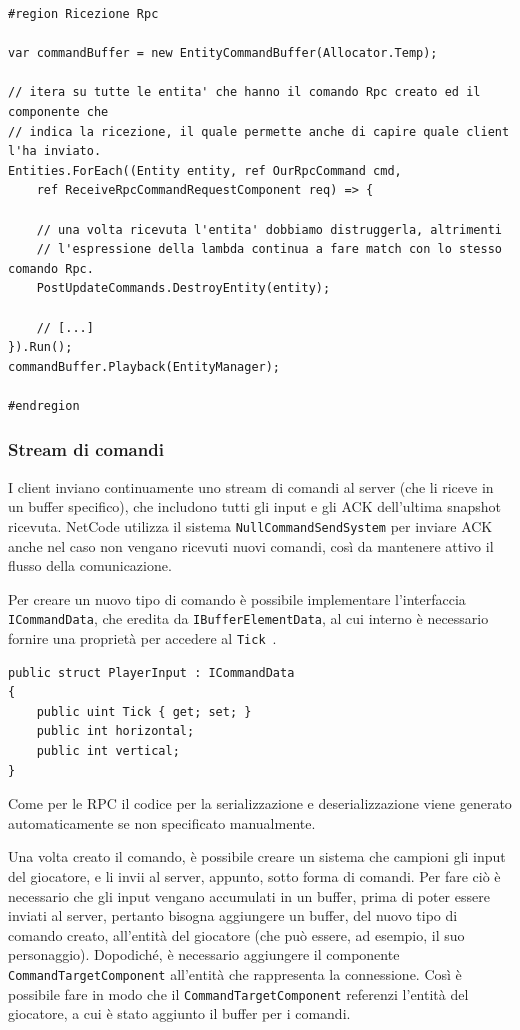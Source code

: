 \begin{lstlisting}[caption={Esempio di ricezione di un comando Rpc sul server.}, label={lst:example-rpc-server-system},language={[Sharp]C}]
#region Ricezione Rpc

var commandBuffer = new EntityCommandBuffer(Allocator.Temp);

// itera su tutte le entita' che hanno il comando Rpc creato ed il componente che
// indica la ricezione, il quale permette anche di capire quale client l'ha inviato.
Entities.ForEach((Entity entity, ref OurRpcCommand cmd,
    ref ReceiveRpcCommandRequestComponent req) => {
    
    // una volta ricevuta l'entita' dobbiamo distruggerla, altrimenti
    // l'espressione della lambda continua a fare match con lo stesso comando Rpc. 
    PostUpdateCommands.DestroyEntity(entity);
    
    // [...]
}).Run();
commandBuffer.Playback(EntityManager);

#endregion
\end{lstlisting}

\subsubsection{Stream di comandi}
I client inviano continuamente uno stream di comandi al server (che li riceve in un buffer specifico), che includono tutti gli input e gli ACK dell'ultima snapshot ricevuta. NetCode utilizza il sistema \verb|NullCommandSendSystem| per inviare ACK anche nel caso non vengano ricevuti nuovi comandi, così da mantenere attivo il flusso della comunicazione.

Per creare un nuovo tipo di comando è possibile implementare l'interfaccia \verb|ICommandData|, che eredita da \verb|IBufferElementData|, al cui interno è necessario fornire una proprietà per accedere al \verb|Tick|~\cite{doc:unity-netcode-api}.

\begin{lstlisting}[caption={Prototipo(client): comando per l'input del giocatore.}, label={lst:example-command-data},language={[Sharp]C}]
public struct PlayerInput : ICommandData
{
    public uint Tick { get; set; }
    public int horizontal;
    public int vertical;
}
\end{lstlisting}

Come per le RPC il codice per la serializzazione e deserializzazione viene generato automaticamente se non specificato manualmente.

Una volta creato il comando, è possibile creare un sistema che campioni gli input del giocatore, e li invii al server, appunto, sotto forma di comandi. Per fare ciò è necessario che gli input vengano accumulati in un buffer, prima di poter essere inviati al server, pertanto bisogna aggiungere un buffer, del nuovo tipo di comando creato, all'entità del giocatore (che può essere, ad esempio, il suo personaggio). Dopodiché, è necessario aggiungere il componente \verb|CommandTargetComponent| all'entità che rappresenta la connessione. Così è possibile fare in modo che il \verb|CommandTargetComponent| referenzi l'entità del giocatore, a cui è stato aggiunto il buffer per i comandi.

